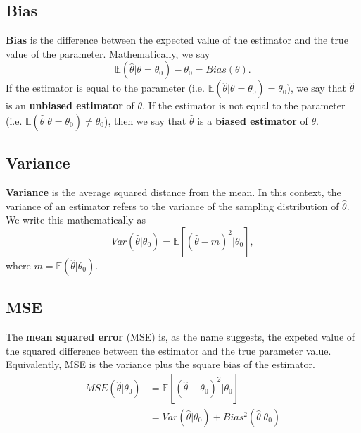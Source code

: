 \documentclass[titlepage, 12pt, leqno]{article}
\begin{document}
\subsection{Bias}

\begin{definition}
    \textbf{Bias} is the difference between the expected value of the estimator and the
    true value of the parameter. Mathematically, we say
    \[
    \mathbb{E}(\hat \theta|\theta=\theta_{0}) - \theta_{0} = Bias(\theta).
    \]
    If the estimator is equal to the parameter (i.e. $ \mathbb{E}(\hat \theta|\theta = 
    \theta_{0}) = \theta_{0}$), we say that $\hat \theta$ is an \textbf{unbiased
    estimator} of $\theta$. If the estimator is not equal to the parameter (i.e.
    $ \mathbb{E}(\hat \theta|\theta=\theta_{0})\ne \theta_{0}$), then we say that
    $\hat \theta$ is a \textbf{biased estimator} of $\theta$.
\end{definition}

\subsection{Variance}
\begin{definition}
    \textbf{Variance} is the average squared distance from the mean. In this context,
    the variance of an estimator refers to the variance of the sampling distribution of
    $\hat \theta$. We write this mathematically as
    \[
        Var(\hat \theta|\theta_{0}) = \mathbb{E}[(\hat \theta-m)^{2}|\theta_{0}],
    \]
    where $m= \mathbb{E}(\hat \theta|\theta_{0})$.
\end{definition}

\subsection{MSE}
\begin{definition}
    The \textbf{mean squared error} (MSE) is, as the name suggests, the expeted value of
    the squared difference between the estimator and the true parameter value. 
    Equivalently, MSE is the variance plus the square bias of the estimator.
    \begin{align*}
        MSE(\hat \theta|\theta_{0}) &= \mathbb{E}[(\hat \theta-\theta_{0})^{2}|
        \theta_{0}]\\
                                    &= Var(\hat \theta|\theta_{0}) + Bias^{2}(\hat \theta
                                    |\theta_{0})
    \end{align*}
\end{definition}
\end{document}
